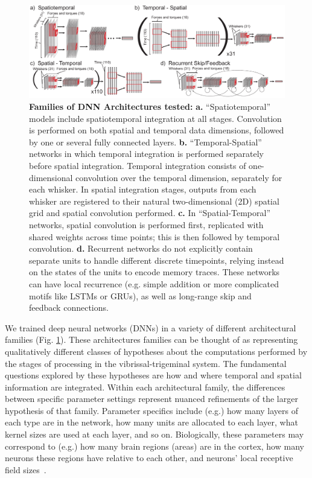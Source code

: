 \begin{figure}
\centering
\includegraphics [width=1\linewidth]{figures/architectures.pdf}
\vspace{-2mm}
\caption{\textbf{Families of DNN Architectures tested:} \textbf{a.} ``Spatiotemporal'' models include spatiotemporal integration at all stages. Convolution is performed on both spatial and temporal data dimensions, followed by one or several fully connected layers. \textbf{b.} ``Temporal-Spatial'' networks in which temporal integration is performed separately before spatial integration.  Temporal integration consists of one-dimensional convolution over the temporal dimension, separately for each whisker. In spatial integration stages, outputs from each whisker are registered to their natural two-dimensional (2D) spatial grid and spatial convolution performed.  \textbf{c.} In ``Spatial-Temporal'' networks, spatial convolution is performed first, replicated with shared weights across time points; this is then followed by temporal convolution. \textbf{d.} Recurrent networks do not explicitly contain separate units to handle different discrete timepoints, relying instead on the states of the units to encode memory traces.  These networks can have local recurrence (e.g. simple addition or more complicated motifs like LSTMs or GRUs), as well as long-range skip and feedback connections.~\label{fig_archi}}
\end{figure}

We trained deep neural networks (DNNs) in a variety of different architectural families (Fig. \ref{fig_archi}).  
These architectures families can be thought of as representing qualitatively different classes of hypotheses about the computations performed by the stages of processing in the vibrissal-trigeminal system. 
The fundamental questions explored by these hypotheses are how and where temporal and spatial information are integrated.
Within each architectural family, the differences between specific parameter settings represent nuanced refinements of the larger hypothesis of that family.   
Parameter specifics include (e.g.) how many layers of each type are in the network, how many units are allocated to each layer, what kernel sizes are used at each layer, and so on.  
Biologically, these parameters may correspond to (e.g.) how many brain regions (areas) are in the cortex, how many neurons these regions have relative to each other, and neurons' local receptive field sizes~\cite{yamins2016using}.
 
